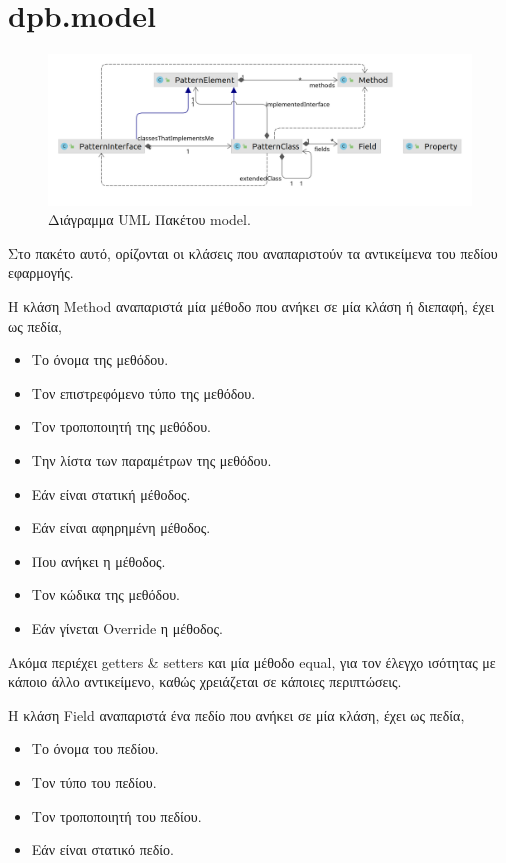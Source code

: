 \section{dpb.model}
\label{sec:dpb.model}
\begin{figure}[H]
    \centering
    \includegraphics[width=1.0\textwidth]{Figures/model.png}
    \caption{Διάγραμμα UML Πακέτου model.}
    \label{fig:modelUML}
\end{figure}
\par
Στο πακέτο αυτό, ορίζονται οι κλάσεις που αναπαριστούν τα αντικείμενα του πεδίου εφαρμογής.
\par
Η κλάση Method αναπαριστά μία μέθοδο που ανήκει σε μία κλάση ή διεπαφή, έχει ως πεδία,
\begin{itemize}
    \item Το όνομα της μεθόδου.
    \item Τον επιστρεφόμενο τύπο της μεθόδου.
    \item Τον τροποποιητή της μεθόδου.
    \item Την λίστα των παραμέτρων της μεθόδου.
    \item Εάν είναι στατική μέθοδος.
    \item Εάν είναι αφηρημένη μέθοδος.
    \item Που ανήκει η μέθοδος.
    \item Τον κώδικα της μεθόδου.
    \item Εάν γίνεται Override η μέθοδος.
\end{itemize}
Ακόμα περιέχει getters \& setters και μία μέθοδο equal, για τον έλεγχο ισότητας με κάποιο άλλο αντικείμενο, 
καθώς χρειάζεται σε κάποιες περιπτώσεις.
\par
Η κλάση Field αναπαριστά ένα πεδίο που ανήκει σε μία κλάση, έχει ως πεδία,
\begin{itemize}
    \item Το όνομα του πεδίου.
    \item Τον τύπο του πεδίου.
    \item Τον τροποποιητή του πεδίου.
    \item Εάν είναι στατικό πεδίο.
\end{itemize}
